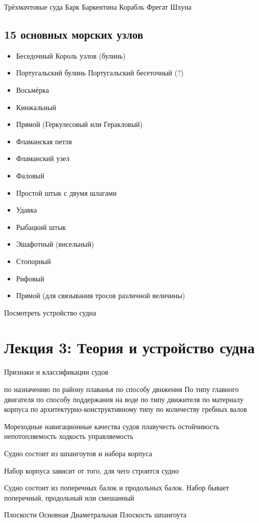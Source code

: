 \documentclass{article}        %
\begin{document}
Трёхмачтовые суда
Барк
Баркентина
Корабль
Фрегат
Шхуна

\subsection{15 основных морских узлов}
\begin{itemize}
	\item Беседочный Король узлов (булинь)
	\item Португальский булинь  Португальский бесеточный (?) 
	\item Восьмёрка
	\item Кинжальный
	\item Прямой (Геркулесовый или Геракловый)
	\item Фламанская петля
	\item Фламанский узел
	\item Фаловый
	\item Простой штык с двумя шлагами
	\item Удавка
	\item Рыбацкий штык
	\item Эшафотный (висельный)
	\item Стопорный
	\item Рифовый
	\item Прямой (для связывания тросов различной величины)
\end{itemize}
Посмотреть устройство судна

\section{Лекция 3: Теория и устройство судна}
Признаки и классификации судов

по назначению
по району плаванья
по способу движения
По типу главного двигателя
по способу поддержания на воде
по типу движителя
по материалу корпуса
по архитектурно-конструктивному типу
по количеству гребных валов

Мореходные навигационные качества судов
плавучесть
остойчивость
непотопляемость
ходкость
управляемость


Судно состоит из шпангоутов и набора корпуса

Набор корпуса зависит от того, для чего строится судно

Судно состоит из поперечных балок и продольных балок. Набор бывает поперечный, продольный или смешанный

Плоскости
Основная
Диаметральная
Плоскость шпангоута
\end{document}
